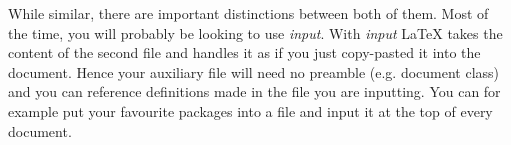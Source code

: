 While similar, there are important distinctions between both of them. Most of the time, you will probably be looking to use \textit{input}. With \textit{input} LaTeX takes the content of the second file and handles it as if you just copy-pasted it into the document. Hence your auxiliary file will need no preamble (e.g. document class) and you can reference definitions made in the file you are inputting. You can for example put your favourite packages into a file and input it at the top of every document.